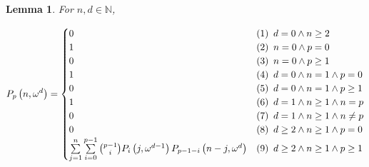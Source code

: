 \documentclass[11pt]{article}
\newcommand{\om}{\omega}
\newcommand{\N}{\mathbb{N}}
\newcommand{\numpoints}{n}
\theoremstyle{plain}
\newtheorem{lemma}[theorem]{Lemma}
\theoremstyle{definition}
\begin{document}
\begin{lemma}
\label{le:P-recur}
For $\numpoints,d \in \N$,


\[
P_p\left( \numpoints,\om^d\right) = \begin{cases}
    0 & \textnormal{(1)\phantom{0} } d = 0 \land \numpoints \geq 2\\
    1 & \textnormal{(2)\phantom{0} } \numpoints = 0 \land p = 0\\
    0 & \textnormal{(3)\phantom{0} } \numpoints = 0 \land p \geq 1\\
    1 & \textnormal{(4)\phantom{0} } d = 0 \land \numpoints = 1 \land p = 0\\
    0 & \textnormal{(5)\phantom{0} } d = 0 \land \numpoints = 1 \land p \geq 1\\
    1 & \textnormal{(6)\phantom{0} } d = 1 \land \numpoints \geq 1 \land \numpoints = p\\
    0 & \textnormal{(7)\phantom{0} } d = 1 \land \numpoints \geq 1 \land \numpoints \neq p\\
    0 & \textnormal{(8)\phantom{0} } d \geq 2 \land \numpoints \geq 1 \land p = 0\\
    \sum\limits_{j=1}^\numpoints \sum\limits_{i=0}^{p-1} \binom{p-1}{i} P_i \left( j,\om^{d-1} \right) P_{p-1-i} \left( \numpoints-j,\om^d\right) & \textnormal{(9)\phantom{0} } d \geq 2 \land \numpoints \geq 1 \land p \geq 1
\end{cases}
\]

\end{lemma}
\end{document}
